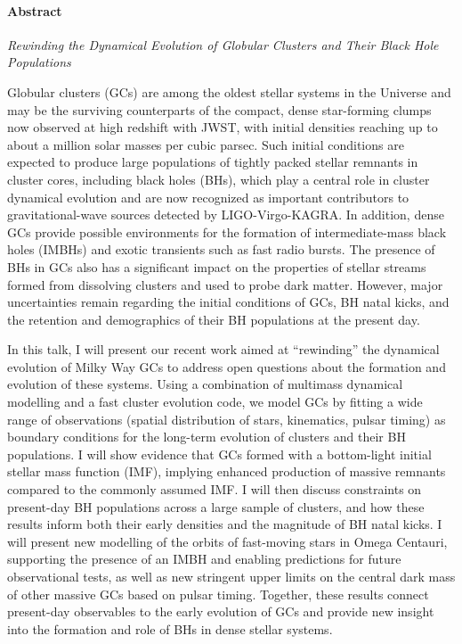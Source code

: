 \paragraph{Abstract}
{\itshape
Rewinding the Dynamical Evolution of Globular Clusters and Their Black Hole Populations

Globular clusters (GCs) are among the oldest stellar systems in the Universe and may be the surviving counterparts of the compact, dense star-forming clumps now observed at high redshift with JWST, with initial densities reaching up to about a million solar masses per cubic parsec. Such initial conditions are expected to produce large populations of tightly packed stellar remnants in cluster cores, including black holes (BHs), which play a central role in cluster dynamical evolution and are now recognized as important contributors to gravitational-wave sources detected by LIGO-Virgo-KAGRA. In addition, dense GCs provide possible environments for the formation of intermediate-mass black holes (IMBHs) and exotic transients such as fast radio bursts. The presence of BHs in GCs also has a significant impact on the properties of stellar streams formed from dissolving clusters and used to probe dark matter. However, major uncertainties remain regarding the initial conditions of GCs, BH natal kicks, and the retention and demographics of their BH populations at the present day.

In this talk, I will present our recent work aimed at “rewinding” the dynamical evolution of Milky Way GCs to address open questions about the formation and evolution of these systems. Using a combination of multimass dynamical modelling and a fast cluster evolution code, we model GCs by fitting a wide range of observations (spatial distribution of stars, kinematics, pulsar timing) as boundary conditions for the long-term evolution of clusters and their BH populations. I will show evidence that GCs formed with a bottom-light initial stellar mass function (IMF), implying enhanced production of massive remnants compared to the commonly assumed IMF. I will then discuss constraints on present-day BH populations across a large sample of clusters, and how these results inform both their early densities and the magnitude of BH natal kicks. I will present new modelling of the orbits of fast-moving stars in Omega Centauri, supporting the presence of an IMBH and enabling predictions for future observational tests, as well as new stringent upper limits on the central dark mass of other massive GCs based on pulsar timing. Together, these results connect present-day observables to the early evolution of GCs and provide new insight into the formation and role of BHs in dense stellar systems.
}

